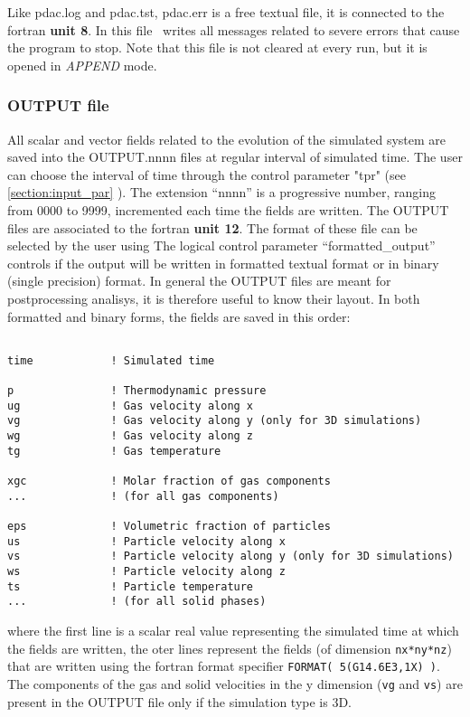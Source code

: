 Like pdac.log and pdac.tst, pdac.err is a free textual file,
it is connected to the fortran {\bf unit 8}. In this file \PDAC\ writes
all messages related to severe errors that cause the program to stop.
Note that this file is not cleared at every run, but it is opened in 
{\it APPEND} mode.

\subsubsection{OUTPUT file}

All scalar and vector fields related to the evolution of the simulated
system are saved into the OUTPUT.nnnn files at regular interval of
simulated time. The user can choose the interval of time through
the control parameter "tpr" (see \ref{section:input_par} ).
The extension ``nnnn'' is a progressive number, ranging from 0000 to 9999, 
incremented each time the fields are written. 
The OUTPUT files are associated to the fortran {\bf unit 12}. 
The format of these file can be selected by the user using
The logical control parameter ``formatted\_output'' controls if the
output will be written in formatted textual format
or in binary (single precision) format. In general the OUTPUT files 
are meant for postprocessing analisys, it is therefore useful to know 
their layout. In both formatted and binary forms, the fields are saved
in this order:

\begin{verbatim}

time            ! Simulated time

p               ! Thermodynamic pressure
ug              ! Gas velocity along x
vg              ! Gas velocity along y (only for 3D simulations)
wg              ! Gas velocity along z
tg              ! Gas temperature

xgc             ! Molar fraction of gas components
...             ! (for all gas components)

eps             ! Volumetric fraction of particles
us              ! Particle velocity along x
vs              ! Particle velocity along y (only for 3D simulations)
ws              ! Particle velocity along z
ts              ! Particle temperature
...             ! (for all solid phases)

\end{verbatim}

where the first line is a scalar real value representing the 
simulated time at which the fields are written, the oter lines
represent the fields (of dimension {\tt nx*ny*nz}) that are written 
using the fortran format specifier {\tt FORMAT( 5(G14.6E3,1X) )}.
The components of the gas and solid velocities in the y dimension
({\tt vg} and {\tt vs}) are present in the OUTPUT file only if the simulation
type is 3D.

